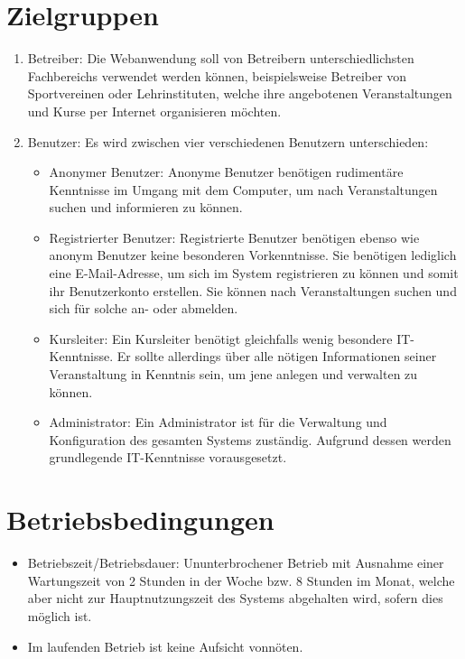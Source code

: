 \documentclass[a4paper]{scrreprt}
\begin{document}
	\section{Zielgruppen}
		 \begin{enumerate}
		 	\item Betreiber: Die Webanwendung soll von Betreibern unterschiedlichsten Fachbereichs verwendet werden können, beispielsweise Betreiber von Sportvereinen oder Lehrinstituten, welche ihre angebotenen Veranstaltungen und Kurse per Internet organisieren möchten.
		 	\item Benutzer: Es wird zwischen vier verschiedenen Benutzern unterschieden:
		 	\begin{itemize}
		 		\item Anonymer Benutzer: Anonyme Benutzer benötigen rudimentäre Kenntnisse im Umgang mit dem Computer, um nach Veranstaltungen suchen und informieren zu können.
		 		\item Registrierter Benutzer: Registrierte Benutzer benötigen ebenso wie anonym Benutzer keine besonderen Vorkenntnisse. Sie benötigen lediglich eine E-Mail-Adresse, um sich im System registrieren zu können und somit ihr Benutzerkonto erstellen. Sie können nach Veranstaltungen suchen und sich für solche an- oder abmelden.
		 		\item Kursleiter: Ein Kursleiter benötigt gleichfalls wenig besondere IT-Kenntnisse. Er sollte allerdings über alle nötigen Informationen seiner Veranstaltung in Kenntnis sein, um jene anlegen und verwalten zu können.
		 		\item Administrator: Ein Administrator ist für die Verwaltung und Konfiguration des gesamten Systems zuständig. Aufgrund dessen werden grundlegende IT-Kenntnisse vorausgesetzt.
		 	\end{itemize}	
		 \end{enumerate}  
        
    
	\section{Betriebsbedingungen}
	       \begin{itemize}
	       	\item Betriebszeit/Betriebsdauer: Ununterbrochener Betrieb mit Ausnahme einer Wartungszeit von 2 Stunden in der Woche bzw. 8 Stunden im Monat, welche aber nicht zur Hauptnutzungszeit des Systems abgehalten wird, sofern dies möglich ist.
	       	\item  Im laufenden Betrieb ist keine Aufsicht vonnöten.
	       \end{itemize}
	
\end{document}
